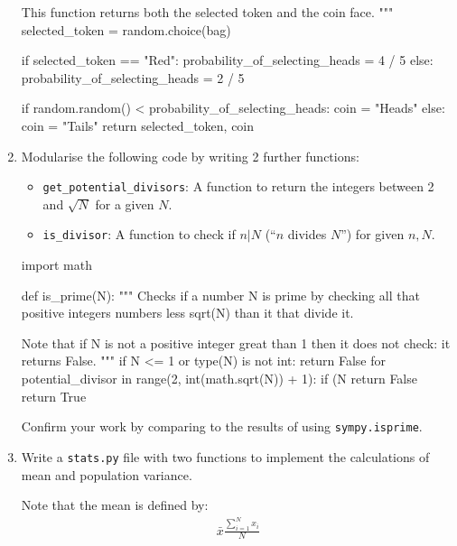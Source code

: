 \begin{enumerate}
\begin{pyin}
    This function returns both the selected token
    and the coin face.
    """
    selected_token = random.choice(bag)

    if selected_token == "Red":
       probability_of_selecting_heads = 4 / 5
    else:
       probability_of_selecting_heads = 2 / 5

    if random.random() < probability_of_selecting_heads:
       coin = "Heads"
    else:
       coin = "Tails"
    return selected_token, coin
\end{pyin}

\item 

Modularise the following code by writing 2 further functions:
\begin{itemize}
\item 

\texttt{get\_potential\_divisors}: A function to return the integers between 2 and
\(\sqrt{N}\) for a given \(N\).

\item 

\texttt{is\_divisor}: A function to check if \(n | N\) (``\(n\) divides \(N\)'') for given
\(n, N\).

\end{itemize}

\begin{pyin}
import math

def is_prime(N):
     """
    Checks if a number N is prime by checking all that positive integers
    numbers less sqrt(N) than it that divide it.

    Note that if N is not a positive integer great than 1 then it does not
    check: it returns False.
    """
    if N <= 1 or type(N) is not int:
        return False
    for potential_divisor in range(2, int(math.sqrt(N)) + 1):
        if (N %
            return False
    return True
\end{pyin}


Confirm your work by comparing to the results of using \texttt{sympy.isprime}.

\item 

Write a \texttt{stats.py} file with two functions to implement the calculations of
mean and population variance.


Note that the mean is defined by:
\begin{equation*}
\begin{split}
    \bar x \frac{\sum_{i=1}^{N} x_i}{N}
   \end{split}
\end{equation*}


\end{enumerate}
